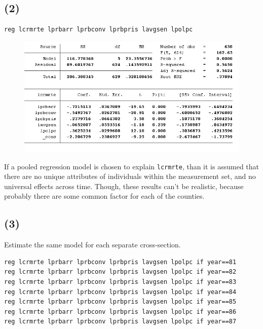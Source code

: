 \documentclass[12pt,a4paper, oneside]{extreport}
\begin{document}
\subsection*{(2)}


\begin{verbatim}
reg lcrmrte lprbarr lprbconv lprbpris lavgsen lpolpc
\end{verbatim}


\begin{figure}[H]
	\centering
	\includegraphics[width=0.7\linewidth]{screenshot012}
	\label{fig:screenshot001}
\end{figure}


If a pooled regression model is chosen to explain  \texttt{lcrmrte}, than it is assumed that there are no unique attributes of individuals within the measurement set, and no universal effects across time. Though, these results can't be realistic, because probably there are some common factor  for  each of the counties.


\subsection*{(3)}

Estimate the same model for each separate cross-section. 

\begin{verbatim}
reg lcrmrte lprbarr lprbconv lprbpris lavgsen lpolpc if year==81
reg lcrmrte lprbarr lprbconv lprbpris lavgsen lpolpc if year==82
reg lcrmrte lprbarr lprbconv lprbpris lavgsen lpolpc if year==83
reg lcrmrte lprbarr lprbconv lprbpris lavgsen lpolpc if year==84
reg lcrmrte lprbarr lprbconv lprbpris lavgsen lpolpc if year==85
reg lcrmrte lprbarr lprbconv lprbpris lavgsen lpolpc if year==86
reg lcrmrte lprbarr lprbconv lprbpris lavgsen lpolpc if year==87
\end{verbatim}
\end{document}
